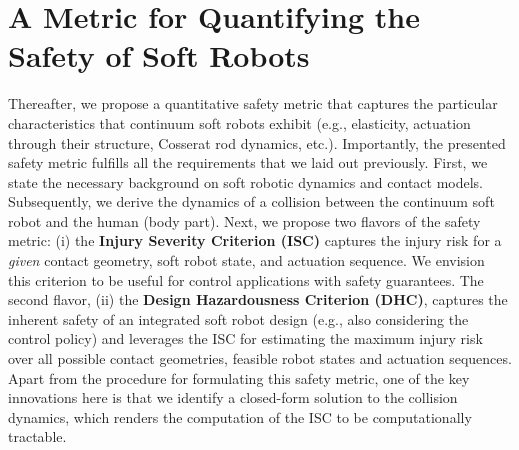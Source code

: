 \section{A Metric for Quantifying the Safety of Soft Robots}
Thereafter, we propose a quantitative safety metric that captures the particular characteristics that continuum soft robots exhibit (e.g., elasticity, actuation through their structure, Cosserat rod dynamics, etc.).
Importantly, the presented safety metric fulfills all the requirements that we laid out previously. %
First, we state the necessary background on soft robotic dynamics and contact models. Subsequently, we derive the dynamics of a collision between the continuum soft robot and the human (body part).
Next, we propose two flavors of the safety metric: (i) the \textbf{Injury Severity Criterion (ISC)} captures the injury risk for a \emph{given} contact geometry, soft robot state, and actuation sequence. We envision this criterion to be useful for control applications with safety guarantees.
The second flavor, (ii) the \textbf{Design Hazardousness Criterion (DHC)}, captures the inherent safety of an integrated soft robot design (e.g., also considering the control policy) and leverages the \gls{ISC} for estimating the maximum injury risk over all possible contact geometries, feasible robot states and actuation sequences.
Apart from the procedure for formulating this safety metric, one of the key innovations here is that we identify a closed-form solution to the collision dynamics, which renders the computation of the \gls{ISC} to be computationally tractable.


